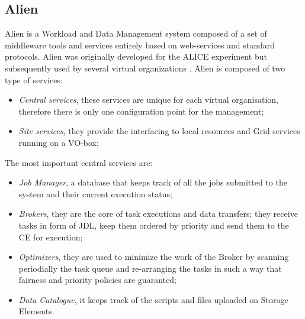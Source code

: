 \subsection{Alien}
Alien is a Workload and Data Management system composed of a 	set of middleware tools and services entirely based on web-services and standard protocols. Alien was originally developed for the ALICE experiment \cite{} but subsequently used by several virtual organizations \cite{}. 
Alien is composed of two type of services:
\begin{itemize}
\item
\emph{Central services}, these services are unique for each virtual organisation, therefore there is only one  configuration point for the management;
\item \emph{Site services}, they provide the interfacing to local resources and Grid services running on a VO-box;
\end{itemize}

The most important central services are:
\begin{itemize}
\item \emph{Job Manager}, a database that keeps track of all the jobs submitted to the system and their current execution status;
\item \emph{Brokers}, they are the core of task executions and data transfers; they receive tasks in form of JDL,  keep them ordered by priority and send them to the CE for execution;
\item \emph{Optimizers}, they are used to minimize the work of the Broker by scanning periodially the task queue and re-arranging the tasks in such a way that fairness and priority policies are guaranted;
\item \emph{Data Catalogue}, it keeps track of the scripts and files uploaded on Storage Elements.
\end{itemize}




